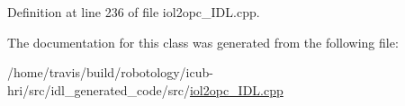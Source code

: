 Definition at line 236 of file iol2opc\+\_\+\+I\+D\+L.\+cpp.



The documentation for this class was generated from the following file\+:\begin{DoxyCompactItemize}
\item 
/home/travis/build/robotology/icub-\/hri/src/idl\+\_\+generated\+\_\+code/src/\hyperlink{iol2opc__IDL_8cpp}{iol2opc\+\_\+\+I\+D\+L.\+cpp}\end{DoxyCompactItemize}
